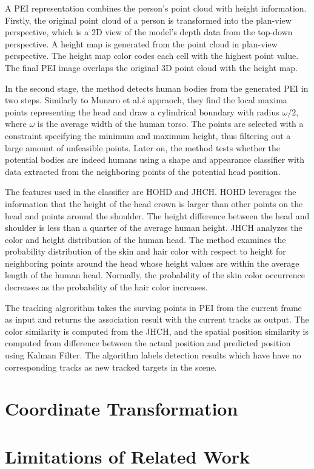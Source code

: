 A PEI representation combines the person's point cloud with height information. Firstly, the original point cloud of a person is transformed into the plan-view perspective, which is a 2D view of the model's depth data from the top-down perspective. A height map is generated from the point cloud in plan-view perspective. The height map color codes each cell with the highest point value. The final PEI image overlaps the original 3D point cloud with the height map.

In the second stage, the method detects human bodies from the generated PEI in two steps. Similarly to Munaro et al.\'s appraoch, they find the local maxima points representing the head and draw a cylindrical boundary with radius $\omega/2$, where $\omega$ is the average width of the human torso. The points are selected with a constraint specifying the minimum and maximum height, thus filtering out a large amount of unfeasible points. Later on, the method tests whether the potential bodies are indeed humans using a shape and appearance classifier with data extracted from the neighboring points of the potential head position.

The features used in the classifier are HOHD and JHCH. HOHD leverages the information that the height of the head crown is larger than other points on the head and points around the shoulder. The height difference between the head and shoulder is less than a quarter of the average human height. JHCH analyzes the color and height distribution of the human head. The method examines the probability distribution of the skin and hair color with respect to height for neighboring points around the head whose height values are within the average length of the human head. Normally, the probability of the skin color occurrence decreases as the probability of the hair color increases.

The tracking algrorithm takes the surving points in PEI from the current frame as input and returns the association result with the current tracks as output. The color similarity is computed from the JHCH, and the spatial position similarity is computed from difference between the actual position and predicted position using Kalman Filter. The algorithm labels detection results which have have no corresponding tracks as new tracked targets in the scene.


\section{Coordinate Transformation}


\cite{eggert_four_algorithms}
\cite{horn_unit_quaternions}
\cite{wei_kinect_calibration}


\section{Limitations of Related Work}


